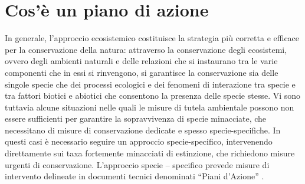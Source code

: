 \documentclass[10pt,twoside,openany,x11names,svgnames,italian,a5paper,dvipsnames,table]{memoir}
\newcommand\chapterillustration{}
\begin{document}
\setlength\afterchapskip{10mm}
\chapter{Cos'\`e un piano di azione}
\renewcommand\chapterillustration{}
\footnotesize
In generale, l'approccio ecosistemico costituisce la strategia più corretta e efficace per la conservazione della natura: attraverso la conservazione degli ecosistemi, ovvero degli ambienti naturali e delle relazioni che si instaurano tra le varie componenti che in essi si rinvengono, si garantisce la conservazione sia delle singole specie che dei processi ecologici e dei fenomeni di interazione tra specie e tra fattori biotici e abiotici che consentono la presenza delle specie stesse.
Vi sono tuttavia alcune situazioni nelle quali le misure di tutela ambientale possono non essere sufficienti per garantire la sopravvivenza di specie minacciate, che necessitano di misure di conservazione dedicate e spesso specie-specifiche. In questi casi è necessario seguire un approccio specie-specifico, intervenendo direttamente sui taxa fortemente minacciati di estinzione, che richiedono misure urgenti di conservazione. L’approccio specie – specifico prevede misure di intervento delineate in documenti tecnici denominati “Piani d’Azione” \cite{EUCOUNCIL98}.
\end{document}
